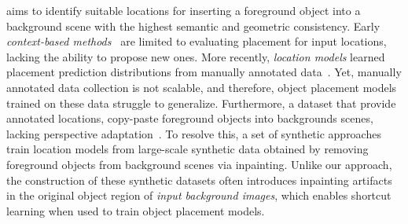 
 aims to identify suitable locations for inserting a foreground object into a background scene with the highest semantic and geometric consistency. Early \textit{context-based methods}~\cite{dvornik2018modeling,volokitin2020efficiently} are limited to evaluating placement for input locations, lacking the ability to propose new ones.  
More recently, \textit{location models} learned placement prediction distributions from manually annotated data~\cite{yun2025imaginingunseengenerativelocation,poska2025hopnet,cheng2025diverse,zhou2022learning,zhang2020and,zhu2023topnet,niu2022fast,zhou2022sac,lee2018context,lin2018st}. Yet, manually annotated data collection
is not scalable, and therefore, object placement models trained on these data struggle to generalize.  Furthermore, a dataset that provide annotated locations, copy-paste foreground objects into backgrounds scenes, lacking perspective adaptation~\cite{liu2021opa,qin2024think}. To resolve this, a set of synthetic approaches~\cite{zhou2025bootplace,winter2025objectmate,gao2025object,wasserman2024paint} train location models from large-scale synthetic data obtained by removing foreground objects from background scenes via inpainting. Unlike our approach, the construction of these synthetic datasets often introduces inpainting artifacts in the original object region of \textit{input background images}, which enables shortcut learning when used to train object placement models.

